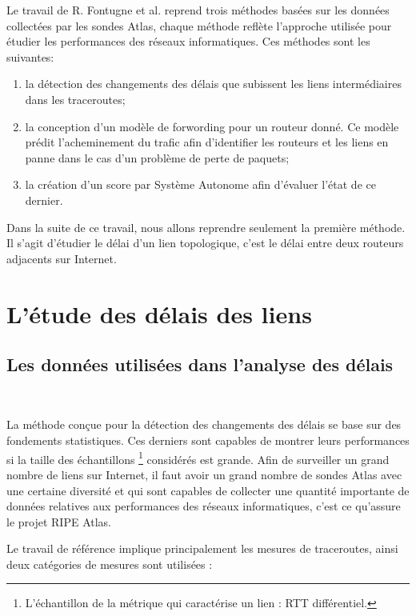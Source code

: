Le travail de R. Fontugne et al. reprend trois méthodes basées sur les données collectées par les sondes Atlas, chaque méthode reflète l'approche utilisée pour étudier les performances des réseaux informatiques. Ces méthodes sont les suivantes:

\begin{enumerate}
	\item la détection des changements des délais que subissent les liens intermédiaires dans les traceroutes; 
	
	\item la conception d'un modèle de forwording pour un routeur donné. Ce modèle  prédit l'acheminement du trafic afin d'identifier les routeurs  et les liens en panne dans le cas  d'un problème  de perte de paquets;
	
	\item la création d'un score par Système Autonome afin d'évaluer l'état de ce dernier.
	
\end{enumerate}

Dans la suite de ce travail, nous allons reprendre seulement la première méthode.  Il s'agit d'étudier le délai d'un lien topologique, c'est le délai entre deux routeurs adjacents sur Internet.


\section{L'étude des délais des liens }

\subsection{Les données utilisées dans l'analyse des délais}~

La méthode conçue pour la détection des changements des délais se base sur des fondements statistiques. Ces derniers sont capables de montrer leurs performances si la taille des échantillons \footnote{L'échantillon de la métrique qui caractérise un lien : RTT différentiel.} considérés est grande.   Afin de surveiller un grand nombre de liens sur Internet, il faut avoir un grand nombre de sondes Atlas avec une certaine diversité et  qui sont capables de collecter une quantité importante de données relatives aux performances des réseaux informatiques, c'est ce qu'assure le projet RIPE Atlas.

Le travail de référence implique principalement les mesures de traceroutes, ainsi deux catégories de mesures sont utilisées :

